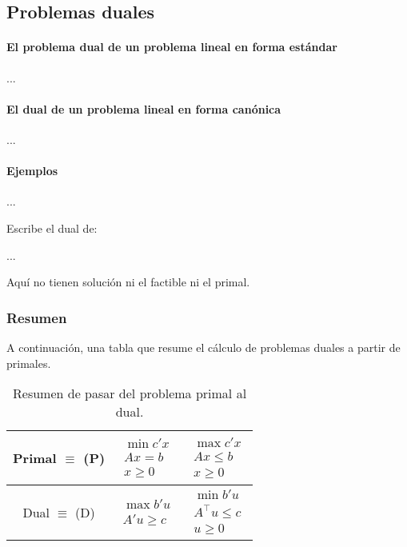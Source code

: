 \subsection{Problemas duales}

\paragraph{El problema dual de un problema lineal en forma estándar}

...

\paragraph{El dual de un problema lineal en forma canónica}

...

\paragraph{Ejemplos}

...


\begin{example} Escribe el dual de:

...

\begin{ioprob}
\end{ioprob}

Aquí no tienen solución ni el factible ni el primal.
\end{example}

\subsubsection{Resumen}

A continuación, una tabla que resume el cálculo de problemas duales a partir de primales.
\begin{table}[hbtp]
\centering
\begin{tabular}{c|c|c}
Primal $\equiv$ (P) & $\begin{array}{c} \min c'x\\Ax = b\\x≥ 0\end{array}$ & $\begin{array}{c} \max c'x\\Ax ≤ b\\x≥ 0\end{array}$\\
\hline
Dual $\equiv$ (D) & $\begin{array}{c} \max b'u\\A'u ≥ c\end{array}$ & $\begin{array}{c} \min b'u\\A^\top u ≤ c\\u≥ 0\end{array}$\\
\end{tabular}
\caption{Resumen de pasar del problema primal al dual.}
\end{table}



